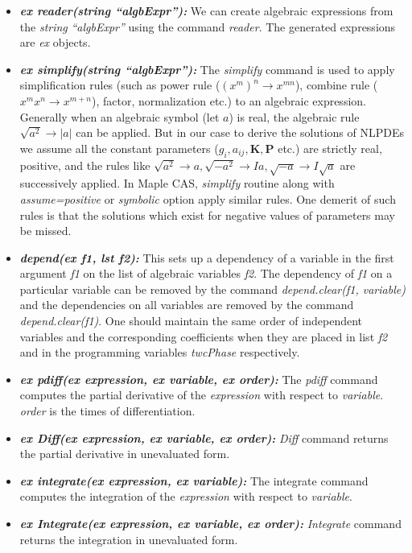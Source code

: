 \documentclass[prd,aps,floats,showkeys,nofootinbib,notitlepage]{revtex4}
\begin{document}
\begin{itemize}
		\item[] {\em \textbf{ex reader(string ``algbExpr''):}} We can create algebraic expressions from the {\em string} {\em ``algbExpr''} using the command {\em reader}. The generated expressions are {\em ex } objects.
		\item[] {\em \textbf{ex simplify(string ``algbExpr''):}} The {\em simplify} command is used to apply simplification rules (such as power rule ($(x^m)^n\rightarrow x^{mn}$), combine rule ($x^mx^n\rightarrow x^{m+n}$), factor, normalization etc.) to an algebraic expression. Generally when an algebraic symbol (let $a$) is real, the algebraic rule $\sqrt{a^2}\rightarrow |a|$ can be applied. But in our case to derive the solutions of NLPDEs we assume all the constant parameters ($g_i,a_{ij},\boldsymbol{K},\boldsymbol{P}$ etc.) are strictly real, positive, and the rules like $\sqrt{a^2}\rightarrow a,\sqrt{-a^2}\rightarrow Ia, \sqrt{-a}\rightarrow I\sqrt{a}$ are successively applied. In {Maple} CAS, {\em simplify} routine along with {\em assume=positive} or {\em symbolic} option apply similar rules. One demerit of such rules is that the solutions which exist for negative values of parameters may be missed. 
		
		\item[] {\em \textbf{depend(ex f1, lst f2):}} This sets up a dependency of a variable in the first argument {\em f1} on the list of algebraic variables {\em f2}. The dependency of {\em f1} on a particular variable can be removed by the command {\em depend.clear(f1, variable)} and the dependencies on all variables are removed by the command {\em depend.clear(f1)}.
		One should maintain the same order of independent variables and the corresponding coefficients when they are placed in list {\em f2} and in the programming variables {\em twcPhase} respectively. 
		\item[] {\em \textbf{ex pdiff(ex expression, ex variable, ex order):}} The {\em pdiff} command computes the partial derivative of the {\em expression} with respect to {\em variable}. {\em order} is the times of differentiation.
		\item[] {\em \textbf{ex Diff(ex expression, ex variable, ex order):}} {\em Diff} command returns the partial derivative in unevaluated form.
		\item[] {\em \textbf{ex integrate(ex expression, ex variable):}} The integrate command computes the integration of the {\em expression} with respect to {\em variable}. 
		
		\item[] {\em \textbf{ex Integrate(ex expression, ex variable, ex order):}} {\em Integrate} command returns the integration in unevaluated form.
		

\end{itemize}
\end{document}
